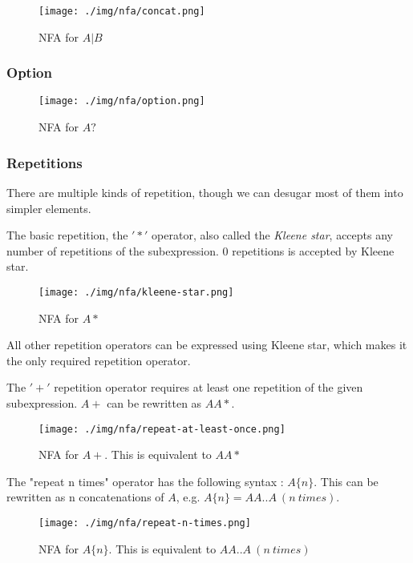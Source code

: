 \documentclass[11pt,a4paper]{report}
\newcommand{\regexp}[1]{$#1$}
\begin{document}
\begin{figure}[h!]
	\centering
	\texttt{[image: ./img/nfa/concat.png]}
	\caption{NFA for \regexp{A|B}}
\end{figure}

\subsubsection{Option}

\begin{figure}[h!]
	\centering
	\texttt{[image: ./img/nfa/option.png]}
	\caption{NFA for \regexp{A?}}
\end{figure}

\subsubsection{Repetitions}

There are multiple kinds of repetition, though we can desugar most of them into simpler elements.

The basic repetition, the $'*'$ operator, also called the \textit{Kleene star}, accepts any number of repetitions of the subexpression. 0 repetitions is accepted by Kleene star.

\begin{figure}[h!]
	\centering
	\texttt{[image: ./img/nfa/kleene-star.png]}
	\caption{NFA for \regexp{A*}}
\end{figure}

All other repetition operators can be expressed using Kleene star, which makes it the only required repetition operator.

The $'+'$ repetition operator requires at least one repetition of the given subexpression. \regexp{A+} can be rewritten as \regexp{AA*}.

\begin{figure}[h!]
	\centering
	\texttt{[image: ./img/nfa/repeat-at-least-once.png]}
	\caption{NFA for \regexp{A+}. This is equivalent to \regexp{AA*}}
\end{figure}

The "repeat n times" operator has the following syntax : \regexp{A\{n\}}. This can be rewritten as n concatenations of $A$, e.g. \regexp{A\{n\} = AA..A\ (n\ times)}.

\begin{figure}[h!]
	\centering
	\texttt{[image: ./img/nfa/repeat-n-times.png]}
	\caption{NFA for \regexp{A\{n\}}. This is equivalent to \regexp{AA..A\ (n\ times)}}
\end{figure}
\end{document}
